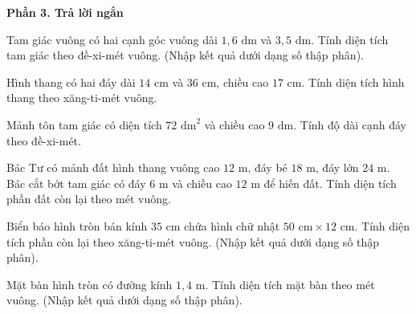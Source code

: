 \textbf{Phần 3. Trả lời ngắn}

\begin{ex} %
Tam giác vuông có hai cạnh góc vuông dài $1{,}6\text{ dm}$ và $3{,}5\text{ dm}$. Tính diện tích tam giác theo đề-xi-mét vuông. (Nhập kết quả dưới dạng số thập phân).
\end{ex}

\begin{ex} %
Hình thang có hai đáy dài $14\text{ cm}$ và $36\text{ cm}$, chiều cao $17\text{ cm}$. Tính diện tích hình thang theo xăng-ti-mét vuông.
\end{ex}

\begin{ex} %
Mảnh tôn tam giác có diện tích $72\text{ dm}^2$ và chiều cao $9\text{ dm}$. Tính độ dài cạnh đáy theo đề-xi-mét.
\end{ex}

\begin{ex} %
Bác Tư có mảnh đất hình thang vuông cao $12\text{ m}$, đáy bé $18\text{ m}$, đáy lớn $24\text{ m}$. Bác cắt bớt tam giác có đáy $6\text{ m}$ và chiều cao $12\text{ m}$ để hiến đất. Tính diện tích phần đất còn lại theo mét vuông.
\end{ex}

\begin{ex} %
Biển báo hình tròn bán kính $35\text{ cm}$ chứa hình chữ nhật $50\text{ cm} \times 12\text{ cm}$. Tính diện tích phần còn lại theo xăng-ti-mét vuông. (Nhập kết quả dưới dạng số thập phân).
\end{ex}

\begin{ex} %
Mặt bàn hình tròn có đường kính $1{,}4\text{ m}$. Tính diện tích mặt bàn theo mét vuông. (Nhập kết quả dưới dạng số thập phân).
\end{ex}
